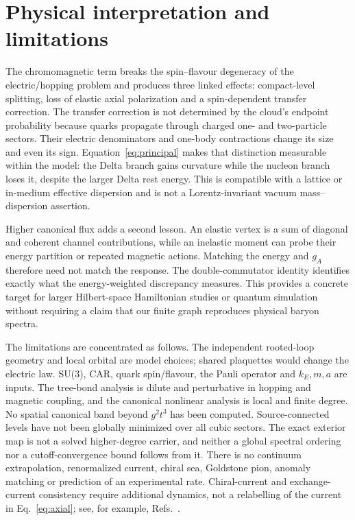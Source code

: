 \documentclass[11pt]{article}
\begin{document}
\section{Physical interpretation and limitations}
The chromomagnetic term breaks the spin--flavour degeneracy of the electric/hopping problem and produces three linked effects: compact-level splitting, loss of elastic axial polarization and a spin-dependent transfer correction. The transfer correction is not determined by the cloud's endpoint probability because quarks propagate through charged one- and two-particle sectors. Their electric denominators and one-body contractions change its size and even its sign. Equation~\eqref{eq:principal} makes that distinction measurable within the model: the Delta branch gains curvature while the nucleon branch loses it, despite the larger Delta rest energy. This is compatible with a lattice or in-medium effective dispersion and is not a Lorentz-invariant vacuum mass--dispersion assertion.

Higher canonical flux adds a second lesson. An elastic vertex is a sum of diagonal and coherent channel contributions, while an inelastic moment can probe their energy partition or repeated magnetic actions. Matching the energy and $g_A$ therefore need not match the response. The double-commutator identity identifies exactly what the energy-weighted discrepancy measures. This provides a concrete target for larger Hilbert-space Hamiltonian studies or quantum simulation without requiring a claim that our finite graph reproduces physical baryon spectra.

The limitations are concentrated as follows. The independent rooted-loop geometry and local orbital are model choices; shared plaquettes would change the electric law. SU(3), CAR, quark spin/flavour, the Pauli operator and $k_E,m,a$ are inputs. The tree-bond analysis is dilute and perturbative in hopping and magnetic coupling, and the canonical nonlinear analysis is local and finite degree. No spatial canonical band beyond $g^2t^3$ has been computed. Source-connected levels have not been globally minimized over all cubic sectors. The exact exterior map is not a solved higher-degree carrier, and neither a global spectral ordering nor a cutoff-convergence bound follows from it. There is no continuum extrapolation, renormalized current, chiral sea, Goldstone pion, anomaly matching or prediction of an experimental rate. Chiral-current and exchange-current consistency require additional dynamics, not a relabelling of the current in Eq.~\eqref{eq:axial}; see, for example, Refs.~\cite{Munczek1995GoldstoneConsistency,BarquillaCano2003AxialExchangeCurrents}.
\end{document}
